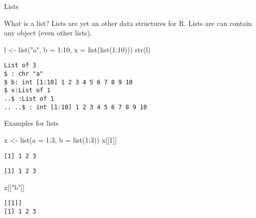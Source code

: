 \documentclass[ignorenonframetext,,t]{beamer}
\newenvironment{Shaded}{\begin{snugshade}}{\end{snugshade}}
\newcommand{\AttributeTok}[1]{\textcolor[rgb]{0.77,0.63,0.00}{#1}}
\newcommand{\DecValTok}[1]{\textcolor[rgb]{0.00,0.00,0.81}{#1}}
\newcommand{\FunctionTok}[1]{\textcolor[rgb]{0.00,0.00,0.00}{#1}}
\newcommand{\NormalTok}[1]{#1}
\newcommand{\OtherTok}[1]{\textcolor[rgb]{0.56,0.35,0.01}{#1}}
\newcommand{\SpecialCharTok}[1]{\textcolor[rgb]{0.00,0.00,0.00}{#1}}
\newcommand{\StringTok}[1]{\textcolor[rgb]{0.31,0.60,0.02}{#1}}
\begin{document}
\begin{frame}[fragile]{Lists}
\protect\hypertarget{lists}{}
\begin{block}{What is a list?}
\protect\hypertarget{what-is-a-list}{}
Lists are yet an other data structures for R. Lists are can contain any
object (even other lists).

\begin{Shaded}
\begin{Highlighting}[]
\NormalTok{l }\OtherTok{\textless{}{-}} \FunctionTok{list}\NormalTok{(}\StringTok{"a"}\NormalTok{, }\AttributeTok{b =} \DecValTok{1}\SpecialCharTok{:}\DecValTok{10}\NormalTok{, }\AttributeTok{x =} \FunctionTok{list}\NormalTok{(}\FunctionTok{list}\NormalTok{(}\DecValTok{1}\SpecialCharTok{:}\DecValTok{10}\NormalTok{)))}
\FunctionTok{str}\NormalTok{(l)}
\end{Highlighting}
\end{Shaded}

\begin{verbatim}
List of 3
$ : chr "a"
$ b: int [1:10] 1 2 3 4 5 6 7 8 9 10
$ x:List of 1
..$ :List of 1
.. ..$ : int [1:10] 1 2 3 4 5 6 7 8 9 10
\end{verbatim}
\end{block}
\end{frame}

\begin{frame}[fragile]
\begin{block}{Examples for lists}
\protect\hypertarget{examples-for-lists}{}
\begin{Shaded}
\begin{Highlighting}[]
\NormalTok{x }\OtherTok{\textless{}{-}} \FunctionTok{list}\NormalTok{(}\AttributeTok{a =} \DecValTok{1}\SpecialCharTok{:}\DecValTok{3}\NormalTok{, }\AttributeTok{b =} \FunctionTok{list}\NormalTok{(}\DecValTok{1}\SpecialCharTok{:}\DecValTok{3}\NormalTok{))}
\NormalTok{x[[}\DecValTok{1}\NormalTok{]]}
\end{Highlighting}
\end{Shaded}

\begin{verbatim}
[1] 1 2 3
\end{verbatim}

\begin{Shaded}
\end{Shaded}

\begin{verbatim}
[1] 1 2 3
\end{verbatim}

\begin{Shaded}
\begin{Highlighting}[]
\NormalTok{x[[}\StringTok{"b"}\NormalTok{]]}
\end{Highlighting}
\end{Shaded}

\begin{verbatim}
[[1]]
[1] 1 2 3
\end{verbatim}
\end{block}
\end{frame}
\end{document}
